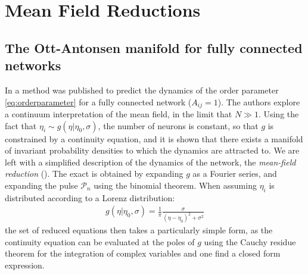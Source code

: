 \newpage
\section{Mean Field Reductions}
\subsection{The Ott-Antonsen manifold for fully connected networks}
In \cite{OttAntonsen2008, OttAntonsen2009, OttAntonsen2010} a method was published to predict the dynamics of the order parameter \eqref{eq:orderparameter} for a fully connected network ($A_{ij} = 1$). The authors explore a continuum interpretation of the mean field, in the limit that  $N \gg 1$. Using the fact that $\eta_i \sim g(\eta \rvert \eta_0, \sigma)$, the number of neurons is constant, so that $g$ is constrained by a continuity equation, and it is shown that there exists a manifold of invariant probability densities to which the dynamics are attracted to. We are left with a simplified description of the dynamics of the network, the \textsl{mean-field reduction} (\MFR). The exact \MFR is obtained by expanding $g$ as a Fourier series, and expanding the pulse $\mathcal{P}_n$ using the binomial theorem. When assuming $\eta_i$ is distributed according to a Lorenz distribution:
\begin{align}
g(\eta |\eta_0, \sigma)=\frac{1}{\pi} \frac{\sigma}{(\eta-\eta_{0})^{2}+\sigma^{2}} \label{eq:Lorentzpdf}
\end{align}
the set of reduced equations then takes a particularly simple form, as the continuity equation can be evaluated at the poles of $g$ using the Cauchy residue theorem for the integration of complex variables and one find a closed form expression.


